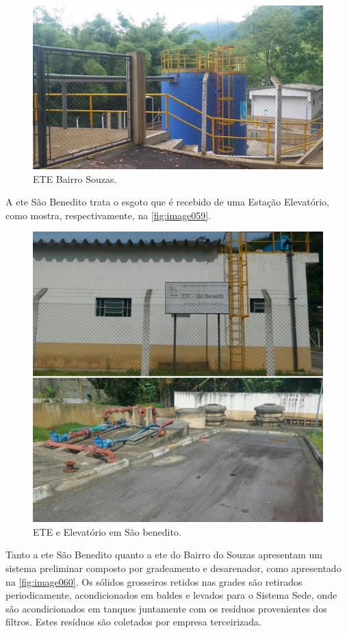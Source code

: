 \begin{figure}
	\centering
	\includegraphics[width=0.75\linewidth]{produtos/prodtres/image058}
	\caption{ETE Bairro Souzas.}
	\label{fig:image058}
\end{figure}


A \gls{ete} São Benedito trata o esgoto que é recebido de uma Estação Elevatório, como mostra, respectivamente, na \autoref{fig:image059}. 

\begin{figure}
	\centering
	\includegraphics[width=0.75\linewidth]{produtos/prodtres/image059}
	\caption{ETE e Elevatório em São benedito.}
	\label{fig:image059}
\end{figure}


Tanto a \gls{ete} São Benedito quanto a \gls{ete} do Bairro do Souzas apresentam um sistema preliminar composto por gradeamento e desarenador, como apresentado na \autoref{fig:image060}. Os sólidos grosseiros retidos nas grades são retirados periodicamente, acondicionados em baldes e levados para o Sistema Sede, onde são acondicionados em tanques juntamente com os resíduos provenientes dos filtros. Estes resíduos são coletados por empresa terceirizada.

